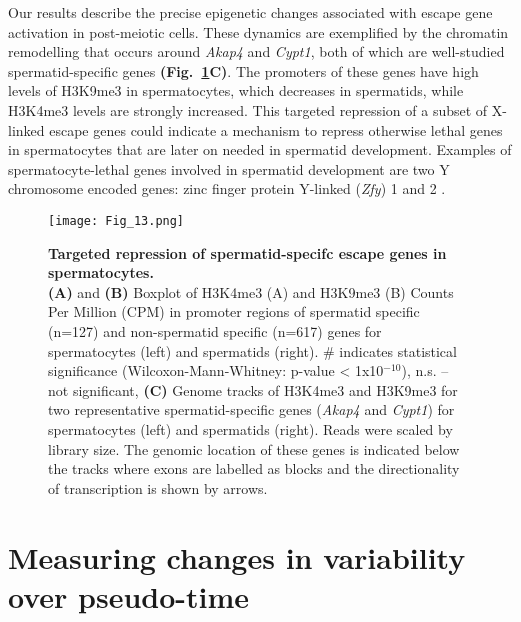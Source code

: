 Our results describe the precise epigenetic changes associated with escape gene activation in post-meiotic cells. These dynamics are exemplified by the chromatin remodelling that occurs around \textit{Akap4} and \textit{Cypt1}, both of which are well-studied spermatid-specific genes \textbf{(Fig.~\ref{fig3:K9_K4_targeted}C)}. The promoters of these genes have high levels of H3K9me3 in spermatocytes, which decreases in spermatids, while H3K4me3 levels are strongly increased. This targeted repression of a subset of X-linked escape genes could indicate a mechanism to repress otherwise lethal genes in spermatocytes that are later on needed in spermatid development. Examples of spermatocyte-lethal genes involved in spermatid development are two Y chromosome encoded genes: zinc finger protein Y-linked (\textit{Zfy}) 1 and 2 \citep{Royo2010}.

\newpage

\begin{figure}[!h]
\centering
\texttt{[image: Fig\_13.png]}
\caption[Targeted repression of spermatid-specifc escape genes in spermatocytes]{\textbf{Targeted repression of spermatid-specifc escape genes in spermatocytes.} \\
\textbf{(A)} and \textbf{(B)} Boxplot of H3K4me3 (A) and H3K9me3 (B) Counts Per Million (CPM) in promoter regions of spermatid specific (n=127) and non-spermatid specific (n=617) genes for spermatocytes (left) and spermatids (right).  \# indicates statistical significance (Wilcoxon-Mann-Whitney: p-value < 1x10$^{-10}$), n.s. – not significant, 
\textbf{(C)} Genome tracks of H3K4me3 and H3K9me3 for two representative spermatid-specific genes (\textit{Akap4} and \textit{Cypt1}) for spermatocytes (left) and spermatids (right). Reads were scaled by library size. The genomic location of these genes is indicated below the tracks where exons are labelled as blocks and the directionality of transcription is shown by arrows.}
\label{fig3:K9_K4_targeted}
\end{figure}

\newpage

\section{Measuring changes in variability over pseudo-time}
\label{sec3:variability_over_PT}

